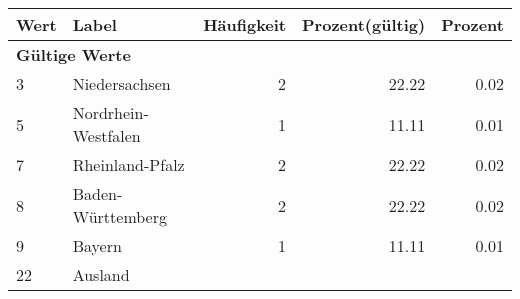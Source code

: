      \begin{longtable}{lXrrr}
     \toprule
     \textbf{Wert} & \textbf{Label} & \textbf{Häufigkeit} & \textbf{Prozent(gültig)} & \textbf{Prozent} \\
     \endhead
     \midrule
     \multicolumn{5}{l}{\textbf{Gültige Werte}}\\

     3 &
     \multicolumn{1}{X}{ Niedersachsen   } &


       \num{2} &
       \num[round-mode=places,round-precision=2]{22.22} &
         \num[round-mode=places,round-precision=2]{0.02} \\

     5 &
     \multicolumn{1}{X}{ Nordrhein-Westfalen   } &


       \num{1} &
       \num[round-mode=places,round-precision=2]{11.11} &
         \num[round-mode=places,round-precision=2]{0.01} \\

     7 &
     \multicolumn{1}{X}{ Rheinland-Pfalz   } &


       \num{2} &
       \num[round-mode=places,round-precision=2]{22.22} &
         \num[round-mode=places,round-precision=2]{0.02} \\

     8 &
     \multicolumn{1}{X}{ Baden-Württemberg   } &


       \num{2} &
       \num[round-mode=places,round-precision=2]{22.22} &
         \num[round-mode=places,round-precision=2]{0.02} \\

     9 &
     \multicolumn{1}{X}{ Bayern   } &


       \num{1} &
       \num[round-mode=places,round-precision=2]{11.11} &
         \num[round-mode=places,round-precision=2]{0.01} \\

     22 &
     \multicolumn{1}{X}{ Ausland   } &



\end{longtable}
